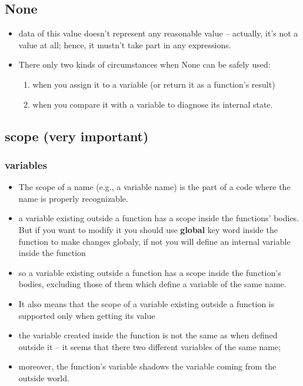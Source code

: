 \documentclass[11pt]{article}
\begin{document}
\subsection{None}
\label{sec:org0d9831e}
\begin{itemize}
\item data of this value doesn’t represent any reasonable value –
actually, it’s not a value at all; hence, it mustn’t take part in
any expressions.
\item There only two kinds of circumstances when None can be safely used:
\begin{enumerate}
\item when you assign it to a variable (or return it as a function’s
result)
\item when you compare it with a variable to diagnose its internal state.
\end{enumerate}
\end{itemize}
\subsection{scope (very important)}
\label{sec:org7a7fde9}
\subsubsection{variables}
\label{sec:org059d1aa}
\begin{itemize}
\item The scope of a name (e.g., a variable name) is the part of a code
where the name is properly recognizable.
\item a variable existing outside a function has a scope inside the
functions’ bodies. But if you want to modify it you should use
\textbf{global} key word inside the function to make changes globaly, if not
you will define an internal variable inside the function
\item so a variable existing outside a function has a scope inside the
function’s bodies, excluding those of them which define a variable
of the same name.
\item It also means that the scope of a variable existing outside a
function is supported only when getting its value
\item the variable created inside the function is not the same as when
defined outside it – it seems that there two different variables of
the same name;
\item moreover, the function’s variable shadows the variable coming from
the outside world.
\end{itemize}
\end{document}
